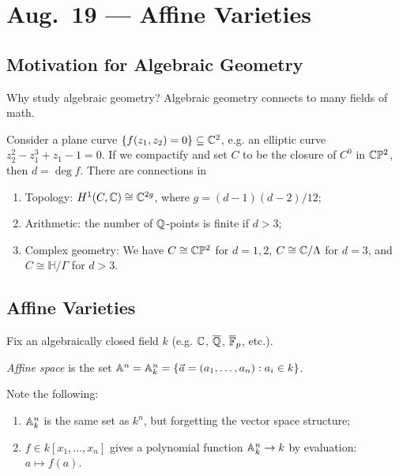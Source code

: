 \chapter{Aug.~19 --- Affine Varieties}

\section{Motivation for Algebraic Geometry}

\begin{remark}
  Why study algebraic geometry? Algebraic
  geometry connects to many fields of math.
\end{remark}

\begin{example}
  Consider a plane curve
  $\{f(z_1, z_2) = 0\} \subseteq \mathbb{C}^2$, e.g.
  an elliptic curve
  $z_2^2 - z_1^3 + z_1 - 1 = 0$.
  If we compactify and set $C$ to be
  the closure of $C^0$ in $\mathbb{C} \mathbb{P}^2$, then
  $d = \deg f$. There are connections in
  \begin{enumerate}
    \item Topology: $H^1(C, \mathbb{C}) \cong \mathbb{C}^{2g}$,
      where $g = (d - 1)(d - 2) / 12$;
    \item Arithmetic: the number of
      $\mathbb{Q}$-points is finite if $d > 3$;
    \item Complex geometry:
      We have $C \cong \mathbb{C} \mathbb{P}^2$ for
      $d = 1, 2$, $C \cong \mathbb{C} / \Lambda$
      for $d = 3$,
      and $C \cong \mathbb{H} / \Gamma$
      for $d > 3$.
  \end{enumerate}
\end{example}

\section{Affine Varieties}

Fix an algebraically closed field $k$ (e.g.
$\mathbb{C}$, $\overline{\mathbb{Q}}$, $\overline{\mathbb{F}}_p$,
etc.).

\begin{definition}
  \emph{Affine space} is the set
  $\mathbb{A}^n = \mathbb{A}^n_k = \{\vec{a} = (a_1, \dots, a_n) : a_i \in k\}$.
\end{definition}

\begin{remark}
  Note the following:
  \begin{enumerate}
    \item $\mathbb{A}^n_k$ is the same set
      as $k^n$, but forgetting the vector
      space structure;
    \item $f \in k[x_1, \dots, x_n]$
      gives a polynomial function
      $\mathbb{A}^n_k \to k$ by evaluation:
      $a \mapsto f(a)$.
  \end{enumerate}
\end{remark}

